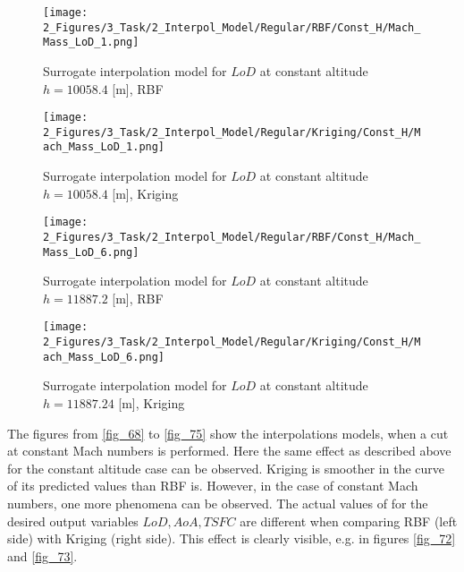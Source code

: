 
\begin{figure}[!h]
    \begin{minipage}[h]{0.46\textwidth}
        \centering
        \texttt{[image: 2\_Figures/3\_Task/2\_Interpol\_Model/Regular/RBF/Const\_H/Mach\_Mass\_LoD\_1.png]}
        \caption{Surrogate interpolation model for $LoD$ at constant altitude $h = 10058.4$ [m], RBF}
        \label{fig_64}    
    \end{minipage}
    \hfill
    \begin{minipage}{0.46\textwidth}
        \centering
        \texttt{[image: 2\_Figures/3\_Task/2\_Interpol\_Model/Regular/Kriging/Const\_H/Mach\_Mass\_LoD\_1.png]}
        \caption{Surrogate interpolation model for $LoD$ at constant altitude $h = 10058.4$ [m], Kriging}
        \label{fig_65}    
    \end{minipage}
\end{figure} 

\begin{figure}[!h]
    \begin{minipage}[h]{0.46\textwidth}
        \centering
        \texttt{[image: 2\_Figures/3\_Task/2\_Interpol\_Model/Regular/RBF/Const\_H/Mach\_Mass\_LoD\_6.png]}
        \caption{Surrogate interpolation model for $LoD$ at constant altitude $h = 11887.2$ [m], RBF}
        \label{fig_66}    
    \end{minipage}
    \hfill
    \begin{minipage}{0.46\textwidth}
        \centering
        \texttt{[image: 2\_Figures/3\_Task/2\_Interpol\_Model/Regular/Kriging/Const\_H/Mach\_Mass\_LoD\_6.png]}
        \caption{Surrogate interpolation model for $LoD$ at constant altitude $h = 11887.24$ [m], Kriging}
        \label{fig_67}    
    \end{minipage}
\end{figure} 





\FloatBarrier
The figures from \ref{fig_68} to \ref{fig_75} show the interpolations 
models, when a cut at constant Mach numbers is performed. 
Here the same effect as described above for 
the constant altitude case can be observed. Kriging 
is smoother in the curve of its predicted values 
than RBF is. However, in the case of constant Mach numbers,
one more phenomena can be observed. The actual 
values of for the desired output variables 
$LoD, AoA, TSFC$ are different when 
comparing RBF (left side) with Kriging (right side).
This effect is clearly visible, e.g. in figures
\ref{fig_72} and \ref{fig_73}.\newline

